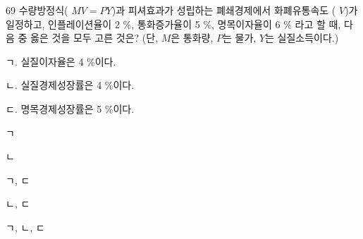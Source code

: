 \begin{question}{69}
수량방정식( $MV=PY$)과 피셔효과가 성립하는 폐쇄경제에서 화폐유통속도 ( $V$)가 일정하고, 인플레이션율이 2 \%, 통화증가율이 5 \%, 명목이자율이 6 \% 라고 할 때, 다음 중 옳은 것을 모두 고른 것은? (단, $M$은 통화량, $P$는 물가, $Y$는 실질소득이다.)
\begin{framedtext}
ㄱ. 실질이자율은 4 \%이다. \par
ㄴ. 실질경제성장률은 4 \%이다. \par
ㄷ. 명목경제성장률은 5 \%이다. \par
\end{framedtext}
\begin{choices}
  \item ㄱ
  \item ㄴ
  \item ㄱ, ㄷ
  \item ㄴ, ㄷ
  \item ㄱ, ㄴ, ㄷ
\end{choices}
\end{question}
